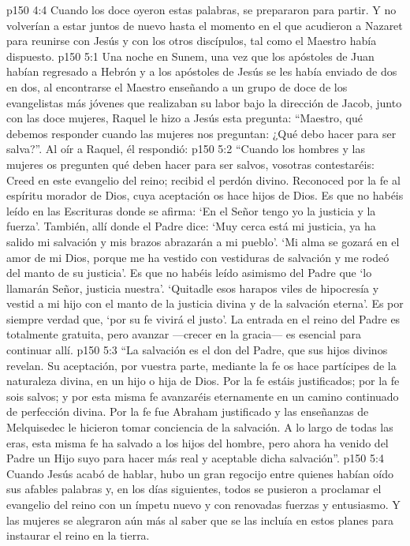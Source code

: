 \vs p150 4:4 Cuando los doce oyeron estas palabras, se prepararon para partir. Y no volverían a estar juntos de nuevo hasta el momento en el que acudieron a Nazaret para reunirse con Jesús y con los otros discípulos, tal como el Maestro había dispuesto.
\vs p150 5:1 Una noche en Sunem, una vez que los apóstoles de Juan habían regresado a Hebrón y a los apóstoles de Jesús se les había enviado de dos en dos, al encontrarse el Maestro enseñando a un grupo de doce de los evangelistas más jóvenes que realizaban su labor bajo la dirección de Jacob, junto con las doce mujeres, Raquel le hizo a Jesús esta pregunta: “Maestro, qué debemos responder cuando las mujeres nos preguntan: ¿Qué debo hacer para ser salva?”. Al oír a Raquel, él respondió:
\vs p150 5:2 \pc “Cuando los hombres y las mujeres os pregunten qué deben hacer para ser salvos, vosotras contestaréis: Creed en este evangelio del reino; recibid el perdón divino. Reconoced por la fe al espíritu morador de Dios, cuya aceptación os hace hijos de Dios. Es que no habéis leído en las Escrituras donde se afirma: ‘En el Señor tengo yo la justicia y la fuerza’. También, allí donde el Padre dice: ‘Muy cerca está mi justicia, ya ha salido mi salvación y mis brazos abrazarán a mi pueblo’. ‘Mi alma se gozará en el amor de mi Dios, porque me ha vestido con vestiduras de salvación y me rodeó del manto de su justicia’. Es que no habéis leído asimismo del Padre que ‘lo llamarán Señor, justicia nuestra’. ‘Quitadle esos harapos viles de hipocresía y vestid a mi hijo con el manto de la justicia divina y de la salvación eterna’. Es por siempre verdad que, ‘por su fe vivirá el justo’. La entrada en el reino del Padre es totalmente gratuita, pero avanzar ---crecer en la gracia--- es esencial para continuar allí.
\vs p150 5:3 “La salvación es el don del Padre, que sus hijos divinos revelan. Su aceptación, por vuestra parte, mediante la fe os hace partícipes de la naturaleza divina, en un hijo o hija de Dios. Por la fe estáis justificados; por la fe sois salvos; y por esta misma fe avanzaréis eternamente en un camino continuado de perfección divina. Por la fe fue Abraham justificado y las enseñanzas de Melquisedec le hicieron tomar conciencia de la salvación. A lo largo de todas las eras, esta misma fe ha salvado a los hijos del hombre, pero ahora ha venido del Padre un Hijo suyo para hacer más real y aceptable dicha salvación”.
\vs p150 5:4 \pc Cuando Jesús acabó de hablar, hubo un gran regocijo entre quienes habían oído sus afables palabras y, en los días siguientes, todos se pusieron a proclamar el evangelio del reino con un ímpetu nuevo y con renovadas fuerzas y entusiasmo. Y las mujeres se alegraron aún más al saber que se las incluía en estos planes para instaurar el reino en la tierra.
